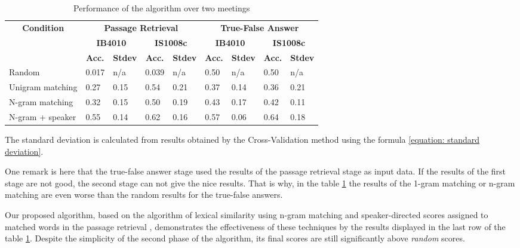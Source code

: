 \begin{table}[htbp]
\caption{Performance of the algorithm over two meetings}
\begin{center}
\begin{tabular}{|l|l|l|l|l|l|l|l|l|}
\hline
\multicolumn{ 1}{|c|}{\textbf{Condition}} & \multicolumn{ 4}{c|}{\textbf{Passage Retrieval}} & \multicolumn{ 4}{c|}{\textbf{True-False Answer}} \\ \cline{ 2- 9}
\multicolumn{ 1}{|c|}{} & \multicolumn{ 2}{c|}{\textbf{IB4010}} & \multicolumn{ 2}{c|}{\textbf{IS1008c}} & \multicolumn{ 2}{c|}{\textbf{IB4010}} & \multicolumn{ 2}{c|}{\textbf{IS1008c}} \\ \cline{ 2- 9}
\multicolumn{ 1}{|c|}{} & \multicolumn{1}{c|}{\textbf{Acc.}} & \multicolumn{1}{c|}{\textbf{Stdev}} & \multicolumn{1}{c|}{\textbf{Acc.}} & \multicolumn{1}{c|}{\textbf{Stdev}} & \multicolumn{1}{c|}{\textbf{Acc.}} & \multicolumn{1}{c|}{\textbf{Stdev}} & \multicolumn{1}{c|}{\textbf{Acc.}} & \multicolumn{1}{c|}{\textbf{Stdev}} \\ \hline
Random & 0.017 & n/a & 0.039 & n/a & 0.50 & n/a & 0.50 & n/a \\ \hline
Unigram matching & 0.27 & 0.15 & 0.54 & 0.21 & 0.37 & 0.14 & 0.36 & 0.21 \\ \hline
N-gram matching & 0.32 & 0.15 & 0.50 & 0.19 & 0.43 & 0.17 & 0.42 & 0.11 \\ \hline
N-gram + speaker & 0.55 & 0.14 & 0.62 & 0.16 & 0.57 & 0.06 & 0.64 & 0.18 \\ \hline
\end{tabular}
\end{center}
\label{Performance of the algorithm over two meetings}
\end{table}


The standard deviation is calculated from results obtained by the Cross-Validation method using the formula \ref{equation: standard deviation}.

One remark is here that the true-false answer stage used the results of the passage retrieval stage as input data. If the results of the first stage are not good, the second stage can not give the nice results. That is why, in the table \ref{Performance of the algorithm over two meetings} the results of the 1-gram matching or n-gram matching are even worse than the random results for the true-false answers.



Our proposed algorithm, based on the algorithm of lexical similarity using n-gram matching and speaker-directed scores assigned to matched words in the passage retrieval  \cite{lequocanh1}, demonstrates the effectiveness of these techniques by the results displayed in the last row of the table \ref{Performance of the algorithm over two meetings}. Despite the simplicity of the second phase of the algorithm, its final scores are still significantly above \textit{random} scores.

